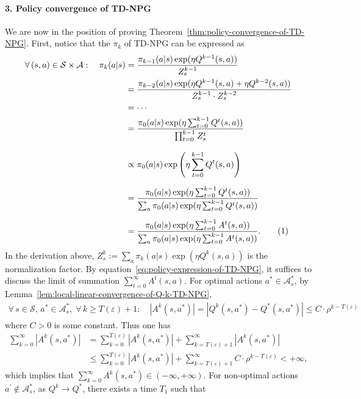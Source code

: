 \documentclass[10pt]{article}
\newcommand{\calA}{\mathcal{A}}
\newcommand{\calS}{\mathcal{S}}
\newcommand{\ls}{\left}
\newcommand{\rs}{\right}
\newcommand\numberthis{\addtocounter{equation}{1}\tag{\theequation}}
\theoremstyle{plain}
\theoremstyle{definition}
\begin{document}
\paragraph{3. Policy convergence of TD-NPG}
We are now in the position of proving Theorem~\ref{thm:policy-convergence-of-TD-NPG}. First, notice that the $\pi_k$ of TD-NPG can be expressed as
\begin{align*}
    \forall\, (s,a) \in \calS \times \calA : \quad \pi_{k}(a|s) &= \frac{\pi_{k-1}(a|s) \exp(\eta Q^{k-1}(s,a))}{Z_s^{k-1}} \\
        &= \frac{\pi_{k-2}(a|s) \exp(\eta Q^{k-1}(s,a) + \eta Q^{k-2}(s,a))}{Z_{s}^{k-1} \cdot Z_s^{k-2}} \\
        &= \cdots \\
        &= \frac{\pi_0(a|s) \exp (\eta \sum_{t=0}^{k-1} Q^t(s,a))}{\prod_{t=0}^{k-1} Z_s^t} \\[.8em]
        &\propto \pi_0(a|s) \exp \ls(\eta \sum_{t=0}^{k-1} Q^t(s,a) \rs) \\[.6em]
        &= \frac{\pi_0(a|s) \exp (\eta \sum_{t=0}^{k-1} Q^t(s,a))}{\sum_a \pi_0(a|s) \exp (\eta \sum_{t=0}^{k-1} Q^t(s,a))} \\[.6em]
        &= \frac{\pi_0(a|s) \exp (\eta \sum_{t=0}^{k-1} A^t(s,a))}{\sum_a \pi_0(a|s) \exp (\eta \sum_{t=0}^{k-1} A^t(s,a))} . \numberthis \label{eq:policy-expression-of-TD-NPG}
\end{align*}
In the derivation above, $Z^{k}_s := \sum_a \pi_k(a|s)\exp(\eta Q^k(s,a))$ is the normalization factor. By equation~\eqref{eq:policy-expression-of-TD-NPG}, it suffices to discuss the limit of summation $\sum_{t=0}^\infty A^t(s,a)$. For optimal actions $a^*\in\calA^*_s$, by Lemma~\ref{lem:local-linear-convergence-of-Q-k-TD-NPG},
\begin{align*}
    \forall\, s\in\calS, \, a^* \in \calA^*_s, \; \forall\, k\geq T(\varepsilon)+1: \quad | A^k(s,a^*) | = | Q^k(s,a^*) - Q^*(s,a^*) | \leq C\cdot \rho^{k-T(\varepsilon)}
\end{align*}
where $C > 0$ is some constant. Thus one has
\begin{align*}
    \sum_{k=0}^\infty |A^k(s,a^*)| &= \sum_{k=0}^{T(\varepsilon)} |A^k(s,a^*)| + \sum_{k=T(\varepsilon)+1}^\infty |A^k(s,a^*)| \\
    &\leq \sum_{k=0}^{T(\varepsilon)} |A^k(s,a^*)| + \sum_{k=T(\varepsilon)+1}^\infty C\cdot \rho^{k-T(\varepsilon)} < +\infty,
\end{align*}
which implies that $\sum_{k=0}^\infty A^k(s,a^*) \in (-\infty, +\infty)$. For non-optimal actions $a^\prime \not\in\calA^*_s$, as $Q^k \to Q^*$, there exists a time $T_1$ such that 
\end{document}
